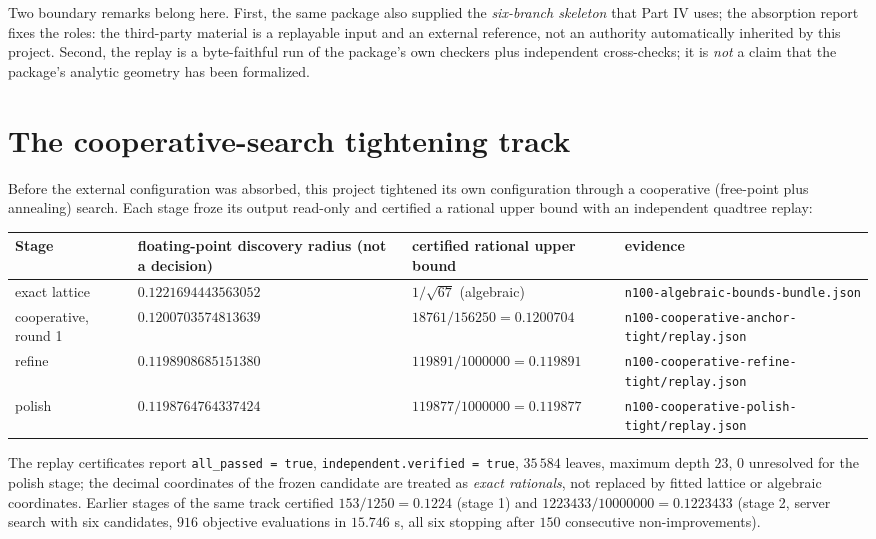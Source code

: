 Two boundary remarks belong here. First, the same package also supplied the \emph{six-branch
skeleton} that Part IV uses; the absorption report fixes the roles: the third-party material is a
replayable input and an external reference, not an authority automatically inherited by this
project. Second, the replay is a byte-faithful run of the package's own checkers plus independent
cross-checks; it is \emph{not} a claim that the package's analytic geometry has been formalized.

\section{The cooperative-search tightening track}

Before the external configuration was absorbed, this project tightened its own configuration
through a cooperative (free-point plus annealing) search. Each stage froze its output read-only and
certified a rational upper bound with an independent quadtree replay:

\begin{center}
\footnotesize
\begin{tabular}{@{}>{\raggedright\arraybackslash}p{}>{\raggedright\arraybackslash}p{}>{\raggedright\arraybackslash}p{}>{\raggedright\arraybackslash}p{}@{}}
\toprule
Stage & floating-point discovery radius (not a decision) & certified rational upper bound & evidence \\
\midrule
exact lattice & $0.1221694443563052$ & $1/\sqrt{67}$ (algebraic) &
\texttt{n100-\allowbreak{}algebraic-\allowbreak{}bounds-\allowbreak{}bundle.json} \\
cooperative, round 1 & $0.1200703574813639$ & $18761/156250=0.1200704$ &
\texttt{n100-\allowbreak{}cooperative-\allowbreak{}anchor-\allowbreak{}tight/\allowbreak{}replay.json} \\
refine & $0.1198908685151380$ & $119891/1000000=0.119891$ &
\texttt{n100-\allowbreak{}cooperative-\allowbreak{}refine-\allowbreak{}tight/\allowbreak{}replay.json} \\
polish & $0.1198764764337424$ & $119877/1000000=0.119877$ &
\texttt{n100-\allowbreak{}cooperative-\allowbreak{}polish-\allowbreak{}tight/\allowbreak{}replay.json} \\
\bottomrule
\end{tabular}
\end{center}

The replay certificates report \texttt{all\_\allowbreak{}passed = true},
\texttt{independent.verified = true}, $35\,584$ leaves, maximum depth $23$, $0$ unresolved for the
polish stage; the decimal coordinates of the frozen candidate are treated as \emph{exact rationals},
not replaced by fitted lattice or algebraic coordinates. Earlier stages of the same track certified
$153/1250=0.1224$ (stage 1) and $1223433/10000000=0.1223433$ (stage 2, server search with six
candidates, $916$ objective evaluations in $15.746$ s, all six stopping after $150$ consecutive
non-improvements).

